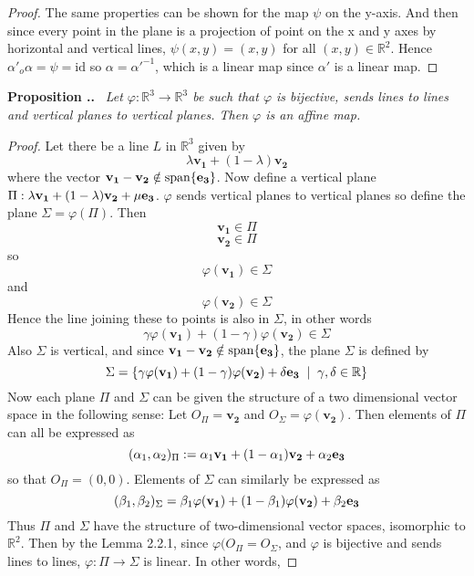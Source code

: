 \documentclass[honours]{UNSWthesis}
\newcommand{\R}{\mathbb{R}}
\newcommand{\1}{\mathbf{e}_{1}}
\newcommand{\2}{\mathbf{e}_{3}}
\newcommand{\3}{\mathbf{e}_{3}}
\newcounter{Item}[section]
\newenvironment{Proposition}{\medskip
                            \refstepcounter{Item}
                            \noindent
                           {\bf Proposition \thesection.\theItem.}\ %
                            \begingroup \sl}
                           {\endgroup\medskip}
\begin{document}
\begin{proof}
The same properties can be shown for the map $\psi$ on the y-axis. And then since every point in the plane is a projection of point on the x and y axes by horizontal and vertical lines, $\psi(x,y)=(x,y)$ for all $(x,y) \in \R^{2}$. Hence $\alpha'_{o}\alpha=\psi=\text{id}$ so $\alpha=\alpha'^{-1}$, which is a linear map since $\alpha'$ is a linear map. 
\end{proof}

\begin{Proposition}
Let $\varphi: \R^{3} \longrightarrow \R^{3}$ be such that $\varphi$ is bijective, sends lines to lines and vertical planes to vertical planes. Then $\varphi$ is an affine map. 
\end{Proposition}  

\begin{proof}
Let there be a line $L$ in $\R^{3}$ given by $$\lambda \mathbf{v_{1}} + (1-\lambda) \mathbf{v_{2}} $$ where the vector $\mathbf{v_{1}}-\mathbf{v_{2}} \notin \text{span} \{ \mathbf{{\bf e}_{3}} \}$. 
Now define a vertical plane $\Pi: \lambda \mathbf{v_{1}} + (1-\lambda) \mathbf{v_{2}} + \mu\mathbf{{\bf e}_{3}}$. $\varphi$ sends vertical planes to vertical planes so define the plane $\Sigma = \varphi(\Pi)$. Then 
\[
\mathbf{v_{1}} \in \Pi
\]
\[
\mathbf{v_{2}} \in \Pi
\]
so 
\[
\varphi(\mathbf{v_{1}}) \in \Sigma
\]
and 
\[
\varphi(\mathbf{v_{2}}) \in \Sigma
\]
Hence the line joining these to points is also in $\Sigma$, in other words
\[
\gamma \varphi(\mathbf{v_{1}}) + (1-\gamma)\varphi(\mathbf{v_{2}}) \in \Sigma
\]
Also $\Sigma$ is vertical, and since $\mathbf{v_{1}}-\mathbf{v_{2}} \notin \text{span}\{ \mathbf{{\bf e}_{3}}\}$, the plane $\Sigma$ is defined by 
\[
\Sigma = \{ \gamma \varphi(\mathbf{v_{1}}) + (1-\gamma)\varphi(\mathbf{v_{2}}) + \delta\mathbf{{\bf e}_{3}} \; \;|\;\; \gamma,\delta \in \R \}
\]
Now each plane $\Pi$ and $\Sigma$ can be given the structure of a two dimensional vector space in the following sense:
Let $O_{\Pi}=\mathbf{v_{2}}$ and $O_{\Sigma}= \varphi(\mathbf{v_{2}})$. Then elements of $\Pi$ can all be expressed as 
\[
(\alpha_{1}, \alpha_{2})_{\Pi}:= \alpha_{1}\mathbf{v_{1}}+(1-\alpha_{1})\mathbf{v_{2}} + \alpha_{2}\mathbf{{\bf e}_{3}}
\]
so that $O_{\Pi}=(0,0)$. 
Elements of $\Sigma$ can similarly be expressed as
\[
(\beta_{1}, \beta_{2})_{\Sigma}= \beta_{1}\varphi(\mathbf{v_{1}})+(1-\beta_{1})\varphi(\mathbf{v_{2}}) + \beta_{2}\mathbf{{\bf e}_{3}}
\]
Thus $\Pi$ and $\Sigma$ have the structure of two-dimensional vector spaces, isomorphic to $\R^2$. Then by the Lemma 2.2.1, since $\varphi(O_{\Pi}=O_{\Sigma}$, and $\varphi$ is bijective and sends lines to lines, $\varphi:\Pi \longrightarrow \Sigma$ is linear. In other words, 

\end{proof}
\end{document}
